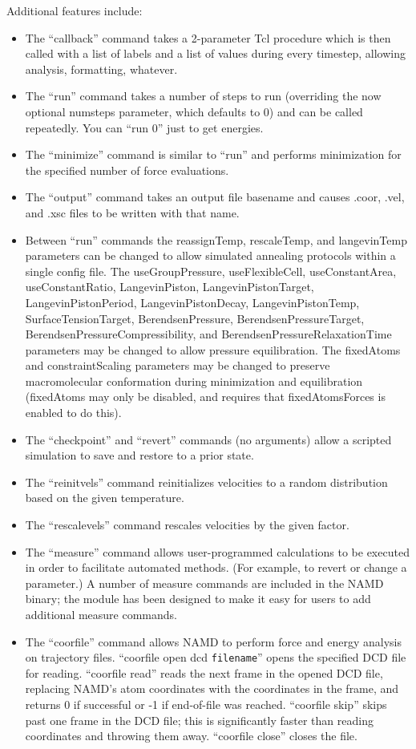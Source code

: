 Additional features include:
\begin{itemize}
 \item The ``callback'' command takes a 2-parameter Tcl procedure which
    is then called with a list of labels and a list of values during
    every timestep, allowing analysis, formatting, whatever.
 \item The ``run'' command takes a number of steps to run (overriding the
    now optional numsteps parameter, which defaults to 0) and can be
    called repeatedly.  You can ``run 0'' just to get energies.
 \item The ``minimize'' command is similar to ``run'' and performs
    minimization for the specified number of force evaluations.
 \item The ``output'' command takes an output file basename and causes
    .coor, .vel, and .xsc files to be written with that name.
 \item Between ``run'' commands the reassignTemp, rescaleTemp, and
    langevinTemp parameters can be changed to allow simulated
    annealing protocols within a single config file.
    The useGroupPressure, useFlexibleCell, useConstantArea, useConstantRatio,
    LangevinPiston, LangevinPistonTarget, LangevinPistonPeriod,
    LangevinPistonDecay, LangevinPistonTemp, SurfaceTensionTarget,
    BerendsenPressure, BerendsenPressureTarget,
    BerendsenPressureCompressibility, and BerendsenPressureRelaxationTime
    parameters may be changed to allow pressure equilibration.
    The fixedAtoms and constraintScaling parameters may be changed to
    preserve macromolecular conformation during minimization and
    equilibration (fixedAtoms may only be disabled, and requires that
    fixedAtomsForces is enabled to do this).
 \item The ``checkpoint'' and ``revert'' commands (no arguments) allow
    a scripted simulation to save and restore to a prior state.
 \item The ``reinitvels'' command reinitializes velocities to a
    random distribution based on the given temperature.
 \item The ``rescalevels'' command rescales velocities by
    the given factor.
 \item The ``measure'' command allows user-programmed calculations to
    be executed in order to facilitate automated methods.  (For
    example, to revert or change a parameter.)  A number of measure
    commands are included in the NAMD binary; the module has been designed
    to make it easy for users to add additional measure commands.  
 \item The ``coorfile'' command allows NAMD to perform force and energy
    analysis on trajectory files.  ``coorfile open dcd {\tt filename}'' opens
    the specified DCD file for reading.  ``coorfile read'' reads the next
    frame in the opened DCD file, replacing NAMD's atom coordinates with the
    coordinates in the frame, and returns 0 if successful or -1 if  
    end-of-file was reached.  ``coorfile skip'' skips past one frame in the
    DCD file; this is significantly faster than reading coordinates and 
    throwing them away.  ``coorfile close'' closes the file.   


\end{itemize}
